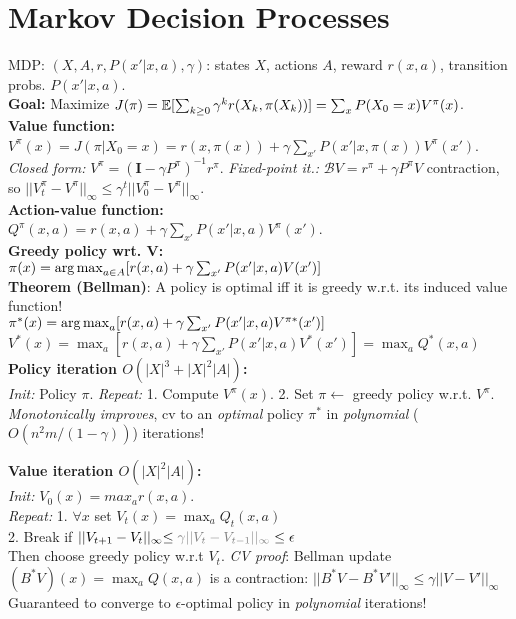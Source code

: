 \section{Markov Decision Processes}
MDP: $(X, A, r, P(x'|x, a), \gamma)$: states $X$, actions $A$, reward $r(x,a)$, transition probs.
    $P(x'|x,a)$.\\ 
\textbf{Goal:} Maximize $J(\pi) = \mathbb{E}[\sum_{k\geq0} \gamma^k r(X_k, \pi(X_k))] = \sum_{x}P(X_0=x)V^\pi(x)$.\\
\textbf{Value function:} $V^\pi(x) = J(\pi|X_0=x) = r(x,\pi(x)) + \gamma\sum_{x'} P(x'|x,\pi(x))V^\pi(x')$.\\
\emph{Closed form:} $V^{\pi} = (\mathbf{I}-\gamma P^\pi)^{-1}r^\pi$. \emph{Fixed-point it.:} $\mathcal{B}V = r^\pi+\gamma P^\pi V$ contraction, so $||V_t^\pi-V^\pi||_\infty \leq \gamma^t||V_0^\pi-V^\pi||_\infty$.\\
\textbf{Action-value function:}\\$Q^\pi(x,a)=r(x,a)+\gamma\sum_{x'}P(x'|x,a)V^\pi(x')$.\\
\textbf{Greedy policy wrt. V:}\\
$\pi(x)=\operatorname*{arg\,max}_{a\in A} [r(x,a)+\gamma \sum_{x'}P(x'|x,a)V(x')]$\\
\textbf{Theorem (Bellman)}: A policy is optimal iff it is greedy w.r.t. its induced value function!\\
\mbox{$\pi^*(x)={\operatorname*{arg\,max}_{a}} [r(x,a)+\gamma \sum_{x'}P(x'|x,a)V^{\pi*}(x')]$}\\
$V^*(x)=\max_a[r(x,a)+\gamma \sum_{x'}P(x'|x,a)V^*(x')]=\max_a Q^*(x,a)$\\
\textbf{Policy iteration $O(|X|^3+|X|^2|A|)$:}\\
\emph{Init:} Policy $\pi$. \emph{Repeat:} 1. Compute $V^\pi (x)$. 2. Set $\pi \leftarrow$ greedy policy w.r.t. $V^\pi$.\\
\emph{Monotonically improves}, cv to an \emph{optimal} policy $\pi^*$ in \emph{polynomial} ($O(n^2m/(1-\gamma))$) iterations!

\textbf{Value iteration $O(|X|^2|A|)$:}\\
\emph{Init:} $V_0(x)=max_a r(x,a)$.\\
\emph{Repeat:}
1. $\forall x$ set $V_t(x)=\max_aQ_t(x,a)$\\
2. Break if $||V_{t+1}-V_{t}||_{\infty}{\leq\color{gray}\gamma||V_t-V_{t-1}||_{\infty}}\leq\epsilon$\\
Then choose greedy policy w.r.t $V_t$.
\emph{CV proof}: Bellman update $(B^*V)(x) = \max_a Q(x,a)$ is a contraction: $||B^*V-B^*V'||_\infty \leq \gamma||V-V'||_\infty$\\
Guaranteed to converge to $\epsilon$-optimal policy in \emph{polynomial} iterations!

